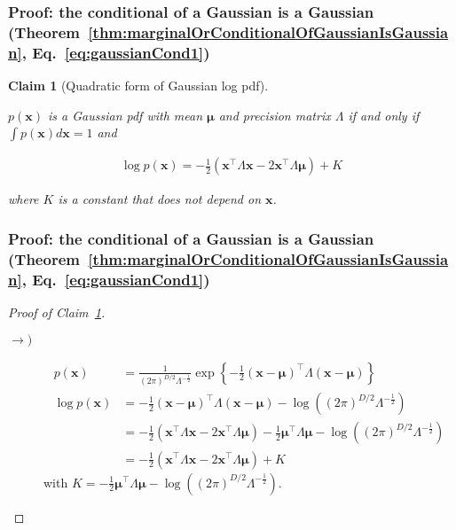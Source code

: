 \documentclass[11pt]{beamer}
\newtheorem{claim}{Claim}
\begin{document}
\begin{frame}
    \frametitle{Proof: the conditional of a Gaussian is a Gaussian (Theorem~\ref{thm:marginalOrConditionalOfGaussianIsGaussian}, Eq.~\ref{eq:gaussianCond1})}

	\begin{claim}[Quadratic form of Gaussian log pdf]
		\label{claim:quadratricFormOfGaussianPDF}

		$p(\mathbf{x})$ is a Gaussian pdf with mean $\boldsymbol{\mu}$ and precision matrix $\Lambda$ if and only if $\int p(\mathbf{x}) d\mathbf{x}=1$ and

		\begin{align}
			\log p(\mathbf{x})=-\frac{1}{2}(\mathbf{x}^\intercal\Lambda\mathbf{x}-2\mathbf{x}^\intercal\Lambda\boldsymbol{\mu})+K\label{eq:gaussianQuadratic}
		\end{align}

		where $K$ is a constant that does not depend on $\mathbf{x}$.

	\end{claim}

\end{frame}

\begin{frame}
    \frametitle{Proof: the conditional of a Gaussian is a Gaussian (Theorem~\ref{thm:marginalOrConditionalOfGaussianIsGaussian}, Eq.~\ref{eq:gaussianCond1})}

	\begin{proof}[Proof of Claim~\ref{claim:quadratricFormOfGaussianPDF}]

		\scriptsize
		\begin{description}
			\item[$\rightarrow)$]

				\begin{align*}
					p(\mathbf{x})&=\frac{1}{(2\pi)^{D/2}\Lambda^{-\frac{1}{2}}}\exp\left\{-\frac{1}{2}(\mathbf{x}-\boldsymbol{\mu})^\intercal\Lambda(\mathbf{x}-\boldsymbol{\mu})\right\}\\
					\log p(\mathbf{x})&=-\frac{1}{2}(\mathbf{x}-\boldsymbol{\mu})^\intercal\Lambda(\mathbf{x}-\boldsymbol{\mu})-\log ((2\pi)^{D/2}\Lambda^{-\frac{1}{2}})\\
					                  &=-\frac{1}{2}(\mathbf{x}^\intercal\Lambda\mathbf{x}-2\mathbf{x}^\intercal\Lambda\boldsymbol{\mu})-\frac{1}{2}\boldsymbol{\mu}^\intercal\Lambda\boldsymbol{\mu}-\log ((2\pi)^{D/2}\Lambda^{-\frac{1}{2}})\\
					                  &=-\frac{1}{2}(\mathbf{x}^\intercal\Lambda\mathbf{x}-2\mathbf{x}^\intercal\Lambda\boldsymbol{\mu})+K
				\end{align*}
				with $K=-\frac{1}{2}\boldsymbol{\mu}^\intercal\Lambda\boldsymbol{\mu}-\log ((2\pi)^{D/2}\Lambda^{-\frac{1}{2}})$.
				\phantom\qedhere
		\end{description}
		\normalsize
	\end{proof}
\end{frame}
\end{document}
